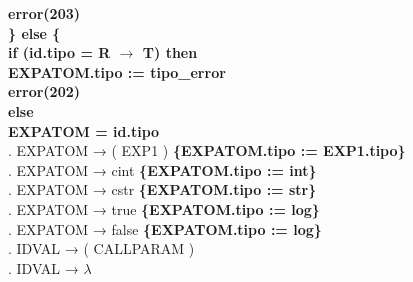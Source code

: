 \begin{tabbing}
    \> \> \> \> \textbf{error(203)}\\
    \> \> \textbf{\} else \{}\\
    \> \> \> \textbf{if (id.tipo = R $\rightarrow$ T) then}\\
    \> \> \> \> \textbf{EXPATOM.tipo := tipo\_error}\\
    \> \> \> \> \textbf{error(202)}\\
    \> \> \> \textbf{else}\\
    \> \> \> \> \textbf{EXPATOM = id.tipo}\\
    . EXPATOM → ( EXP1 ) \>\textbf{\{EXPATOM.tipo := EXP1.tipo\}}\\
    . EXPATOM → cint \>\textbf{\{EXPATOM.tipo := int\}}\\
    . EXPATOM → cstr \>\textbf{\{EXPATOM.tipo := str\}}\\
    . EXPATOM → true \>\textbf{\{EXPATOM.tipo := log\}}\\
    . EXPATOM → false \>\textbf{\{EXPATOM.tipo := log\}}\\
    . IDVAL → ( CALLPARAM )\\
    . IDVAL → $\lambda$\\
\end{tabbing}
